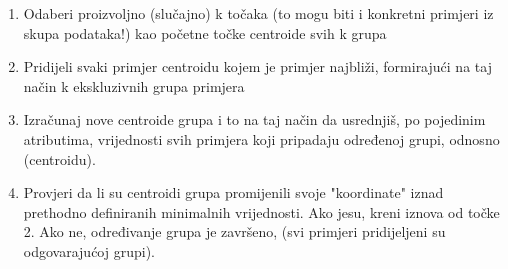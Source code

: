 \documentclass[times, utf8, zavrsni, numeric]{fer}
\begin{document}
\begin{enumerate}
\item	Odaberi proizvoljno (slučajno) k točaka (to mogu biti i konkretni primjeri iz skupa podataka!) kao početne točke centroide svih k grupa
\item Pridijeli svaki primjer centroidu kojem je primjer najbliži, formirajući na taj način k ekskluzivnih grupa primjera
\item Izračunaj nove centroide grupa i to na taj način da usrednjiš, po pojedinim atributima, vrijednosti svih primjera koji pripadaju određenoj grupi, 
odnosno (centroidu).
\item Provjeri da li su centroidi grupa promijenili svoje "koordinate" iznad prethodno definiranih minimalnih vrijednosti. Ako jesu, kreni iznova od točke 2. Ako ne, određivanje grupa je završeno, (svi primjeri pridijeljeni su odgovarajućoj grupi).
\end{enumerate}
\end{document}
